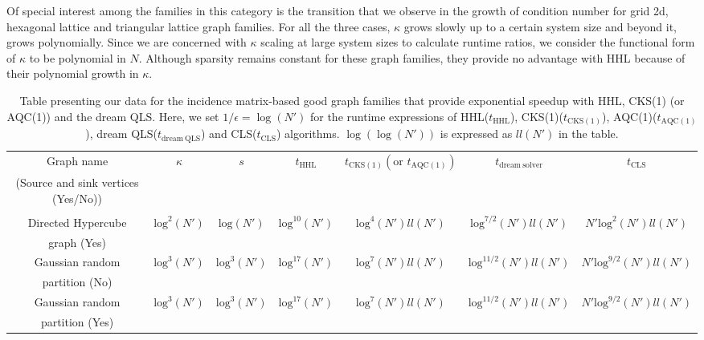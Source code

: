 \documentclass[%
 reprint,
 superscriptaddress,
 amsmath,amssymb,
 aps,
 pra,
floatfix,
nofootinbib,
]{revtex4-2}
\theoremstyle{definition}
\theoremstyle{remark}
\begin{document}
Of special interest among the families in this category is the transition that we observe in the growth of condition number for grid 2d, hexagonal lattice and triangular lattice graph families. For all the three cases, $\kappa$ grows slowly up to a certain system size and beyond it, grows polynomially. Since we are concerned with $\kappa$ scaling at large system sizes to calculate runtime ratios, we consider the functional form of $\kappa$ to be polynomial in $N$. Although sparsity remains constant for these graph families, they provide no advantage with HHL because of their polynomial growth in $\kappa$. 

\newcommand{\coll}[7]{#1 &#2 &#3 &#4 &#5  &#6 &#7 \\ } 
\begin{table}[t] 
\caption{Table presenting our data for the incidence matrix-based good graph families that provide exponential speedup with HHL, CKS(1) (or AQC(1)) and the dream QLS. Here, we set $1/\epsilon=\log{(N')}$ for the runtime expressions of HHL($t_{\mathrm{HHL}}$), CKS(1)($t_{\mathrm{CKS(1)}}$), AQC(1)($t_{\mathrm{AQC(1)}}$), dream QLS($t_{\mathrm{dream \ QLS}}$) and CLS($t_{\mathrm{CLS}}$) algorithms. $\log(\log(N'))$ is expressed as $ll(N')$ in the table. } 
\label{tab:incidence_complexity} 
\centering 
\hspace*{-1.3cm}
\begin{tabular}{|c|c|c|c|c|c|c|} 
\hline 
\coll{Graph name}{$\kappa$}{$s$}{$t_{\mathrm{HHL}}$}{$t_{\mathrm{CKS(1)}}(\text{or }t_{\mathrm{AQC(1)}}) $}
{$t_{\mathrm{dream\ solver}}$}
{$t_{\mathrm{CLS}}$}
\coll{(Source and sink vertices (Yes/No))}{}{}{}{}{}{}
\coll{}{}{}{}{}{}{}

\hline \hline 

\coll{Directed Hypercube}{$\mathrm{log}^2(N')$}{$\mathrm{log}(N')$}{$\mathrm{log}^{10}(N')$}{$\mathrm{log}^4(N')ll(N')$}{$\mathrm{log}^{7/2}(N')ll(N')$}
{$N' \mathrm{log}^{2}(N') ll(N')$}
\coll{graph (Yes)}{}{}{}{}{}{}
\hline 

\coll{Gaussian random }{$\mathrm{log}^3(N')$}{$\mathrm{log}^3(N')$}{$\mathrm{log}^{17}(N')$}{$\mathrm{log}^7(N')ll(N')$}{$\mathrm{log}^{11/2}(N')ll(N')$}
{$N' \mathrm{log}^{9/2}(N') ll(N')$}
\coll{partition (No)}{}{}{}{}{}{}
\hline 

\coll{Gaussian random }{$\mathrm{log}^3(N')$}{$\mathrm{log}^3(N')$}{$\mathrm{log}^{17}(N')$}{$\mathrm{log}^7(N')ll(N')$}{$\mathrm{log}^{11/2}(N')ll(N')$}
{$N' \mathrm{log}^{9/2}(N') ll(N')$}
\coll{partition (Yes)}{}{}{}{}{}{}
\hline 


\end{tabular}
\end{table}
\end{document}
